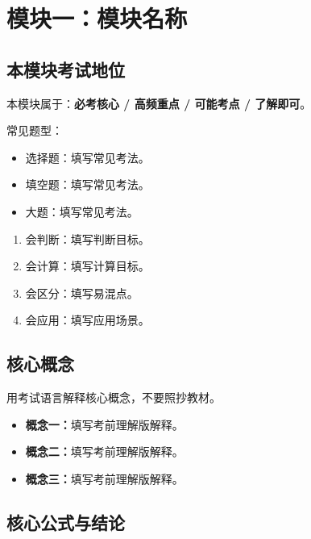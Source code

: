 \documentclass[UTF8,zihao=-4]{ctexart}
\begin{document}
\section{模块一：模块名称}

\subsection{本模块考试地位}

本模块属于：\textbf{必考核心 / 高频重点 / 可能考点 / 了解即可}。

常见题型：
\begin{itemize}
  \item 选择题：填写常见考法。
  \item 填空题：填写常见考法。
  \item 大题：填写常见考法。
\end{itemize}

\begin{keybox}[本模块复习目标]
\begin{enumerate}
  \item 会判断：填写判断目标。
  \item 会计算：填写计算目标。
  \item 会区分：填写易混点。
  \item 会应用：填写应用场景。
\end{enumerate}
\end{keybox}

\subsection{核心概念}

用考试语言解释核心概念，不要照抄教材。

\begin{itemize}
  \item \textbf{概念一：}填写考前理解版解释。
  \item \textbf{概念二：}填写考前理解版解释。
  \item \textbf{概念三：}填写考前理解版解释。
\end{itemize}

\subsection{核心公式与结论}
\end{document}
